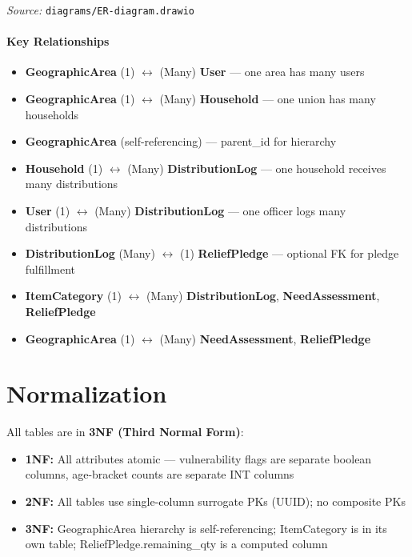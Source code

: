 \noindent\textit{Source:} \texttt{diagrams/ER-diagram.drawio}

\paragraph{Key Relationships}

\begin{itemize}[nosep]
    \item \textbf{GeographicArea} (1) $\longleftrightarrow$ (Many) \textbf{User} --- one area has many users
    \item \textbf{GeographicArea} (1) $\longleftrightarrow$ (Many) \textbf{Household} --- one union has many households
    \item \textbf{GeographicArea} (self-referencing) --- parent\_id for hierarchy
    \item \textbf{Household} (1) $\longleftrightarrow$ (Many) \textbf{DistributionLog} --- one household receives many distributions
    \item \textbf{User} (1) $\longleftrightarrow$ (Many) \textbf{DistributionLog} --- one officer logs many distributions
    \item \textbf{DistributionLog} (Many) $\longleftrightarrow$ (1) \textbf{ReliefPledge} --- optional FK for pledge fulfillment
    \item \textbf{ItemCategory} (1) $\longleftrightarrow$ (Many) \textbf{DistributionLog}, \textbf{NeedAssessment}, \textbf{ReliefPledge}
    \item \textbf{GeographicArea} (1) $\longleftrightarrow$ (Many) \textbf{NeedAssessment}, \textbf{ReliefPledge}
\end{itemize}

\section{Normalization}
All tables are in \textbf{3NF (Third Normal Form)}:

\begin{itemize}[nosep]
    \item \textbf{1NF:} All attributes atomic --- vulnerability flags are separate boolean columns, age-bracket counts are separate INT columns
    \item \textbf{2NF:} All tables use single-column surrogate PKs (UUID); no composite PKs
    \item \textbf{3NF:} GeographicArea hierarchy is self-referencing; ItemCategory is in its own table; ReliefPledge.remaining\_qty is a computed column
\end{itemize}

